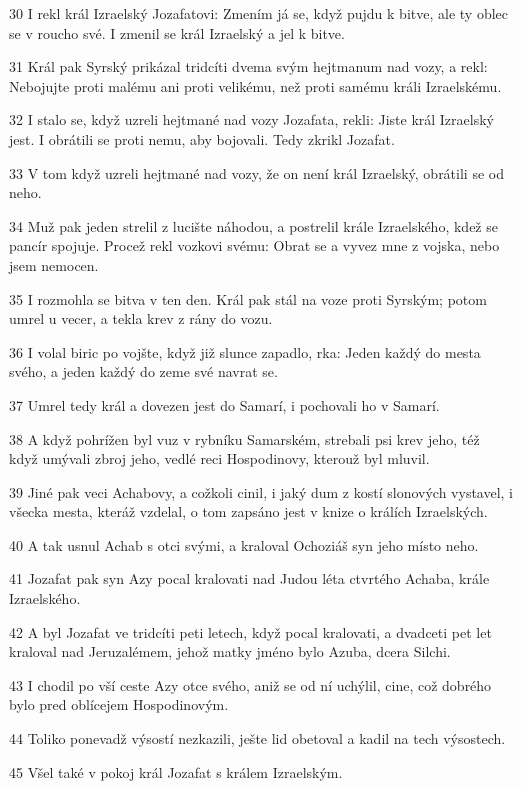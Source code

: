 \par 30 I rekl král Izraelský Jozafatovi: Zmením já se, když pujdu k bitve, ale ty oblec se v roucho své. I zmenil se král Izraelský a jel k bitve.
\par 31 Král pak Syrský prikázal tridcíti dvema svým hejtmanum nad vozy, a rekl: Nebojujte proti malému ani proti velikému, než proti samému králi Izraelskému.
\par 32 I stalo se, když uzreli hejtmané nad vozy Jozafata, rekli: Jiste král Izraelský jest. I obrátili se proti nemu, aby bojovali. Tedy zkrikl Jozafat.
\par 33 V tom když uzreli hejtmané nad vozy, že on není král Izraelský, obrátili se od neho.
\par 34 Muž pak jeden strelil z lucište náhodou, a postrelil krále Izraelského, kdež se pancír spojuje. Procež rekl vozkovi svému: Obrat se a vyvez mne z vojska, nebo jsem nemocen.
\par 35 I rozmohla se bitva v ten den. Král pak stál na voze proti Syrským; potom umrel u vecer, a tekla krev z rány do vozu.
\par 36 I volal biric po vojšte, když již slunce zapadlo, rka: Jeden každý do mesta svého, a jeden každý do zeme své navrat se.
\par 37 Umrel tedy král a dovezen jest do Samarí, i pochovali ho v Samarí.
\par 38 A když pohrížen byl vuz v rybníku Samarském, strebali psi krev jeho, též když umývali zbroj jeho, vedlé reci Hospodinovy, kterouž byl mluvil.
\par 39 Jiné pak veci Achabovy, a cožkoli cinil, i jaký dum z kostí slonových vystavel, i všecka mesta, kteráž vzdelal, o tom zapsáno jest v knize o králích Izraelských.
\par 40 A tak usnul Achab s otci svými, a kraloval Ochoziáš syn jeho místo neho.
\par 41 Jozafat pak syn Azy pocal kralovati nad Judou léta ctvrtého Achaba, krále Izraelského.
\par 42 A byl Jozafat ve tridcíti peti letech, když pocal kralovati, a dvadceti pet let kraloval nad Jeruzalémem, jehož matky jméno bylo Azuba, dcera Silchi.
\par 43 I chodil po vší ceste Azy otce svého, aniž se od ní uchýlil, cine, což dobrého bylo pred oblícejem Hospodinovým.
\par 44 Toliko ponevadž výsostí nezkazili, ješte lid obetoval a kadil na tech výsostech.
\par 45 Všel také v pokoj král Jozafat s králem Izraelským.
